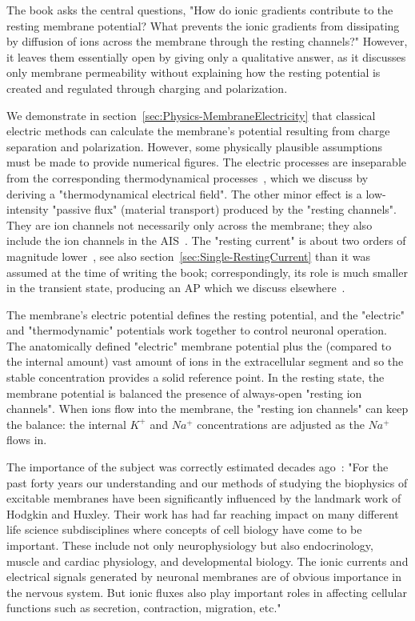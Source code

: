 The book asks the central questions, "How do ionic gradients contribute to the resting membrane potential? What prevents
the ionic gradients from dissipating by diffusion of
ions across the membrane through the resting channels?"
However, it leaves them essentially open by giving only a qualitative answer, as it discusses only membrane permeability without explaining how the resting potential is created and regulated through charging and polarization.

We demonstrate in section~\ref{sec:Physics-MembraneElectricity} that classical electric methods can calculate the membrane's potential resulting from charge separation and polarization.
However, some physically plausible assumptions must be made to provide numerical figures.
The electric processes are inseparable from the corresponding thermodynamical processes~\cite{VeghNon-ordinaryLaws:2025}, which we discuss by deriving a "thermodynamical electrical field".
The other minor effect is a low-intensity "passive flux" (material transport) produced by the
"resting channels". They are ion channels not necessarily only across the membrane; they also include the ion channels in the \gls{AIS}~\cite{AIS_NeuronalPolarity:2010, ActionPotentialGenerationNatrium:2008, BackpropagationAP:2012, AIS_Updated_Viewpoint:2018, AISStructureReview:2018}.
The "resting current" is about two orders of magnitude lower~\cite{EnergyNeuralCommunication:2021}, see also section~\ref{sec:Single-RestingCurrent} than it was assumed at the time of writing the book; correspondingly, its role is much smaller in the transient state, producing an
\gls{AP}
which we discuss elsewhere~\cite{VeghUnifiedCrossdisciplinaryModel:2026}.

The membrane's electric potential defines the resting potential, and the "electric" and "thermodynamic" potentials work together to control neuronal operation.  
The anatomically defined "electric" membrane potential plus the (compared to the internal amount) vast amount of ions in the extracellular segment and so the stable concentration provides a solid reference point.
In the resting state, the membrane potential is balanced the presence of always-open "resting ion  channels". When ions flow
into the membrane, the "resting ion  channels"
can keep the balance: the internal $K^+$ and $Na^+$ concentrations are adjusted as the $Na^+$ flows in.


The importance of the subject was correctly estimated decades ago~\cite{UpdateHodgkinHuxley:1990}:
"For the past forty years our understanding and our methods
of studying the biophysics of excitable membranes have been significantly
influenced by the landmark work of Hodgkin and Huxley. Their work has
had far reaching impact on many different life science subdisciplines where
concepts of cell biology have come to be important. These include not only
neurophysiology but also endocrinology, muscle and cardiac physiology, and
developmental biology. The ionic currents and electrical signals generated by
neuronal membranes are of obvious importance in the nervous system. But
ionic fluxes also play important roles in affecting cellular functions such as
secretion, contraction, migration, etc."



